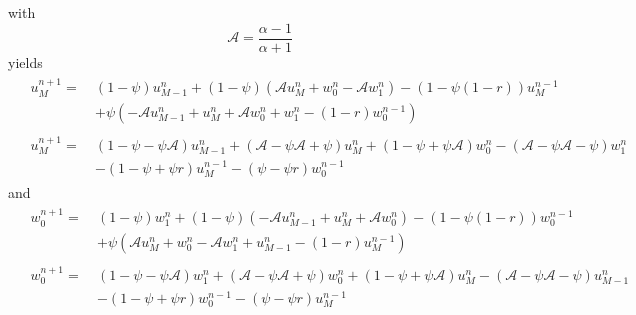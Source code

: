 \documentclass[dvipsnames]{article}
\def\Iterm{\mathcal{A}}
\begin{document}
with 
\begin{equation}
    \Iterm = \frac{\alpha - 1}{\alpha + 1}
\end{equation}
yields
\begin{align}
    &\begin{aligned}
    u^{n+1}_M =\ & (1-\psi)u_{M-1}^n + (1-\psi)\left(\Iterm u_{M}^n + w_0^n - \Iterm w_1^n\right) - (1-\psi(1-r))u_M^{n-1} \\
    &+ \psi\left(-\Iterm u_{M-1}^n + u_{M}^n+ \Iterm w_{0}^n + w_1^n - (1-r)w_0^{n-1}\right)
    \end{aligned}\nonumber\\
    &\begin{aligned}
    u_M^{n+1} =\ & (1-\psi - \psi\Iterm)u_{M-1}^n + (\Iterm-\psi \Iterm + \psi)u_M^n + (1-\psi + \psi\Iterm) w_0^n - (\Iterm-\psi \Iterm - \psi) w_1^n\\
    &- (1 - \psi + \psi r) u_M^{n-1} - (\psi - \psi r) w_0^{n-1}\end{aligned}\label{eq:uMnp1expanded}
\end{align}
and
\begin{align}
    &\begin{aligned}
    w^{n+1}_0 =\ & (1-\psi)w_1^n + (1-\psi)\left(-\Iterm u_{M-1}^n + u_M^n + \Iterm w_0^n\right) - (1-\psi(1-r))w_0^{n-1}\\
    &+ \psi\left(\Iterm u_M^n + w_0^n-\Iterm w_1^n + u_{M-1}^n - (1-r)u_M^{n-1}\right)
    \end{aligned}\nonumber\\
    &\begin{aligned}
    w_0^{n+1} =\ & (1-\psi - \psi\Iterm)w_1^n + (\Iterm-\psi \Iterm + \psi)w_0^n + (1-\psi + \psi\Iterm) u_M^n - (\Iterm-\psi \Iterm - \psi) u_{M-1}^n\\
    &- (1 - \psi + \psi r) w_0^{n-1} - (\psi - \psi r) u_M^{n-1}\end{aligned}
    \label{eq:w0np1expanded} 
\end{align}
        
\end{document}
